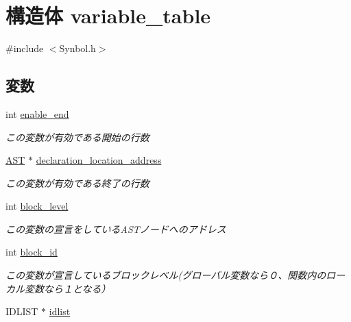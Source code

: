 \section{構造体 variable\_\-table}
\label{structvariable__table}


{\ttfamily \#include $<$Synbol.h$>$}

\subsection*{変数}
\begin{DoxyCompactItemize}
\item 
int \hyperlink{structvariable__table_a69b24ee97fe37831cbfe54edf6c5a9c0}{enable\_\-end}\label{structvariable__table_a69b24ee97fe37831cbfe54edf6c5a9c0}

\begin{DoxyCompactList}\small\item\em この変数が有効である開始の行数 \item\end{DoxyCompactList}\item 
\hyperlink{structabstract__syntax__tree}{AST} $\ast$ \hyperlink{structvariable__table_ad4eca9a1daf1ccf260a672768a054d73}{declaration\_\-location\_\-address}\label{structvariable__table_ad4eca9a1daf1ccf260a672768a054d73}

\begin{DoxyCompactList}\small\item\em この変数が有効である終了の行数 \item\end{DoxyCompactList}\item 
int \hyperlink{structvariable__table_a7dfd4036a14e108dda08ce0bd83e7fe1}{block\_\-level}\label{structvariable__table_a7dfd4036a14e108dda08ce0bd83e7fe1}

\begin{DoxyCompactList}\small\item\em この変数の宣言をしているASTノードへのアドレス \item\end{DoxyCompactList}\item 
int \hyperlink{structvariable__table_a689fe54448fbbc46aaebb56203005cc4}{block\_\-id}\label{structvariable__table_a689fe54448fbbc46aaebb56203005cc4}

\begin{DoxyCompactList}\small\item\em この変数が宣言しているブロックレベル(グローバル変数なら０、関数内のローカル変数なら１となる） \item\end{DoxyCompactList}\item 
IDLIST $\ast$ \hyperlink{structvariable__table_ab7fbad4dd717512360b7f947a277b10b}{idlist}\label{structvariable__table_ab7fbad4dd717512360b7f947a277b10b}


\end{DoxyCompactItemize}
